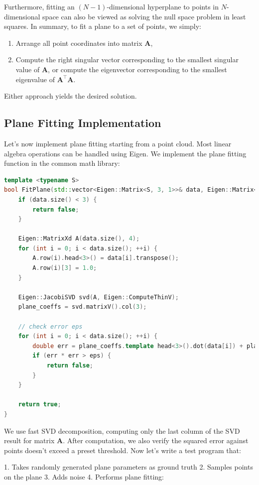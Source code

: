 Furthermore, fitting an $(N-1)$-dimensional hyperplane to points in $N$-dimensional space can also be viewed as solving the null space problem in least squares. In summary, to fit a plane to a set of points, we simply:  

\begin{enumerate}
\item Arrange all point coordinates into matrix $\mathbf{A}$,  
\item Compute the right singular vector corresponding to the smallest singular value of $\mathbf{A}$, or compute the eigenvector corresponding to the smallest eigenvalue of $\mathbf{A}^\top \mathbf{A}$.  
\end{enumerate}

Either approach yields the desired solution.

\subsection{Plane Fitting Implementation}
Let's now implement plane fitting starting from a point cloud. Most linear algebra operations can be handled using Eigen. We implement the plane fitting function in the common math library:

\begin{lstlisting}[language=c++,caption=src/common/math\_utils.h]
template <typename S>
bool FitPlane(std::vector<Eigen::Matrix<S, 3, 1>>& data, Eigen::Matrix<S, 4, 1>& plane_coeffs, double eps = 1e-2) {
	if (data.size() < 3) {
		return false;
	}
	
	Eigen::MatrixXd A(data.size(), 4);
	for (int i = 0; i < data.size(); ++i) {
		A.row(i).head<3>() = data[i].transpose();
		A.row(i)[3] = 1.0;
	}
	
	Eigen::JacobiSVD svd(A, Eigen::ComputeThinV);
	plane_coeffs = svd.matrixV().col(3);
	
	// check error eps
	for (int i = 0; i < data.size(); ++i) {
		double err = plane_coeffs.template head<3>().dot(data[i]) + plane_coeffs[3];
		if (err * err > eps) {
			return false;
		}
	}
	
	return true;
}
\end{lstlisting}

We use fast SVD decomposition, computing only the last column of the SVD result for matrix $\mathbf{A}$. After computation, we also verify the squared error against points doesn't exceed a preset threshold. Now let's write a test program that:

1. Takes randomly generated plane parameters as ground truth
2. Samples points on the plane 
3. Adds noise
4. Performs plane fitting:

